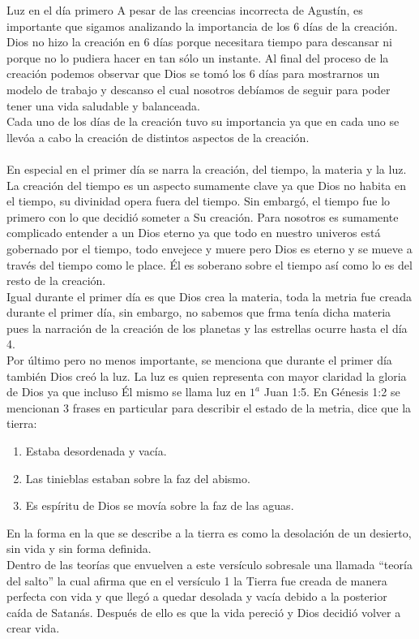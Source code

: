 \begin{section}{Luz en el día primero}
A pesar de las creencias incorrecta de Agustín, es importante que sigamos analizando la importancia de los 6 días de la creación. Dios no hizo la creación en 6 días porque necesitara tiempo para descansar ni porque no lo pudiera hacer en tan sólo un instante. Al final del proceso de la creación podemos observar que Dios se tomó los 6 días para mostrarnos un modelo de trabajo y descanso el cual nosotros debíamos de seguir para poder tener una vida saludable y balanceada.\\
Cada uno de los días de la creación tuvo su importancia ya que en cada uno se llevóa a cabo la creación de distintos aspectos de la creación.\\
\\
En especial en el primer día se narra la creación, del tiempo, la materia y la luz. La creación del tiempo es un aspecto sumamente clave ya que Dios no habita en el tiempo, su divinidad opera fuera del tiempo. Sin embargó, el tiempo fue lo primero con lo que decidió someter a Su creación. Para nosotros es sumamente complicado entender a un Dios eterno ya que todo en nuestro univeros está gobernado por el tiempo, todo envejece y muere pero Dios es eterno y se mueve a través del tiempo como le place. Él es soberano sobre el tiempo así como lo es del resto de la creación.\\
Igual durante el primer día es que Dios crea la materia, toda la metria fue creada durante el primer día, sin embargo, no sabemos que frma tenía dicha materia pues la narración de la creación de los planetas y las estrellas ocurre hasta el día 4.\\
Por último pero no menos importante, se menciona que durante el primer día también Dios creó la luz. La luz es quien representa con mayor claridad la gloria de Dios ya que incluso Él mismo se llama luz en $1^{a}$ Juan 1:5.
\newpage
En Génesis 1:2 se mencionan 3 frases en particular para describir el estado de la metria, dice que la tierra:
\begin{enumerate}
	\item Estaba desordenada y vacía.
	\item Las tinieblas estaban sobre la faz del abismo.
	\item Es espíritu de Dios se movía sobre la faz de las aguas.
\end{enumerate}
En la forma en la que se describe a la tierra es como la desolación de un desierto, sin vida y sin forma definida.\\
Dentro de las teorías que envuelven a este versículo sobresale una llamada ``teoría del salto'' la cual afirma que en el versículo 1 la Tierra fue creada de manera perfecta con vida y que llegó a quedar desolada y vacía debido a la posterior caída de Satanás. Después de ello es que la vida pereció y Dios decidió volver a crear vida.\\

\end{section}
